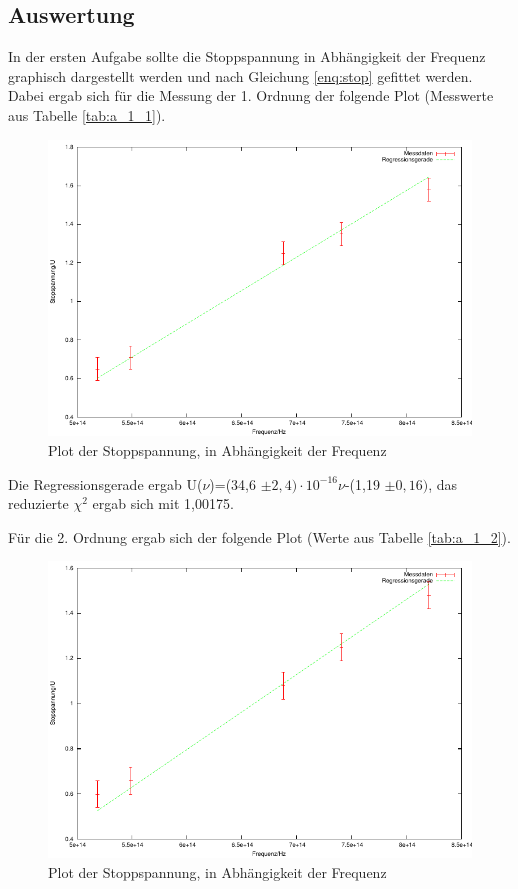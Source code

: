 \documentclass[12px]{scrartcl}
\begin{document}
\newpage
\subsection{Auswertung}
In der ersten Aufgabe sollte die Stoppspannung in Abhängigkeit der Frequenz graphisch dargestellt werden und nach Gleichung \ref{enq:stop} gefittet werden. Dabei ergab sich für die Messung der 1. Ordnung der folgende Plot (Messwerte aus Tabelle \ref{tab:a_1_1}).

\begin{figure}[H]
\centering
    \includegraphics[scale = 1]{a_1_1.pdf}
  	\caption[Plot der Stoppspannung, in Abhängigkeit der Frequenz]{Plot der Stoppspannung, in Abhängigkeit der Frequenz}
  \label{fig:a_3_A}
\end{figure}

Die Regressionsgerade ergab U($\nu$)=(34,6 $\pm 2,4)\cdot10^{-16} \nu$-(1,19 $\pm 0,16)$, das reduzierte $\chi^2$ ergab sich mit 1,00175.

\newpage
Für die 2. Ordnung ergab sich der folgende Plot (Werte aus Tabelle \ref{tab:a_1_2}).

\begin{figure}[H]
\centering
    \includegraphics[scale = 1]{a_1_2.pdf}
  	\caption[Plot der Stoppspannung, in Abhängigkeit der Frequenz]{Plot der Stoppspannung, in Abhängigkeit der Frequenz}
  \label{fig:a_3_A}
\end{figure}
\end{document}
